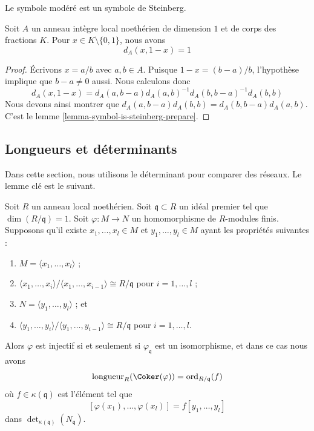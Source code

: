 \noindent
Le symbole modéré est un symbole de Steinberg.

\begin{lemma}
\label{lemma-symbol-is-steinberg}
Soit $A$ un anneau intègre local noethérien de dimension $1$
et de corps des fractions $K$. Pour $x \in K \setminus \{0, 1\}$,
nous avons
$$
d_A(x, 1 -x) = 1
$$
\end{lemma}

\begin{proof}
Écrivons $x = a/b$ avec $a, b \in A$.
Puisque $1 - x = (b - a)/b$, l'hypothèse implique
que $b - a \not = 0$ aussi. Nous calculons donc
$$
d_A(x, 1 - x)
=
d_A(a, b - a)d_A(a, b)^{-1}d_A(b, b - a)^{-1}d_A(b, b)
$$
Nous devons ainsi montrer que
$d_A(a, b - a) d_A(b, b) = d_A(b, b - a) d_A(a, b)$.
C'est le lemme \ref{lemma-symbol-is-steinberg-prepare}.
\end{proof}










\subsection{Longueurs et déterminants}
\label{subsection-length-determinant}

\noindent
Dans cette section, nous utilisons le déterminant pour comparer des réseaux.
Le lemme clé est le suivant.

\begin{lemma}
\label{lemma-key-lemma}
Soit $R$ un anneau local noethérien.
Soit $\mathfrak q \subset R$ un idéal premier tel que $\dim(R/\mathfrak q) = 1$.
Soit $\varphi : M \to N$ un homomorphisme de $R$-modules finis.
Supposons qu'il existe $x_1, \ldots, x_l \in M$ et $y_1, \ldots, y_l \in M$
ayant les propriétés suivantes :
\begin{enumerate}
\item $M = \langle x_1, \ldots, x_l\rangle$ ;
\item $\langle x_1, \ldots, x_i\rangle / \langle x_1, \ldots, x_{i - 1}\rangle
\cong R/\mathfrak q$ pour $i = 1, \ldots, l$ ;
\item $N = \langle y_1, \ldots, y_l\rangle$ ; et
\item $\langle y_1, \ldots, y_i\rangle / \langle y_1, \ldots, y_{i - 1}\rangle
\cong R/\mathfrak q$ pour $i = 1, \ldots, l$.
\end{enumerate}
Alors $\varphi$ est injectif si et seulement si $\varphi_{\mathfrak q}$ est un
isomorphisme, et dans ce cas nous avons
$$
\text{longueur}_R(\Coker(\varphi)) = \text{ord}_{R/\mathfrak q}(f)
$$
où $f \in \kappa(\mathfrak q)$ est l'élément tel que
$$
[\varphi(x_1), \ldots, \varphi(x_l)] = f [y_1, \ldots, y_l]
$$
dans $\det_{\kappa(\mathfrak q)}(N_{\mathfrak q})$.
\end{lemma}

